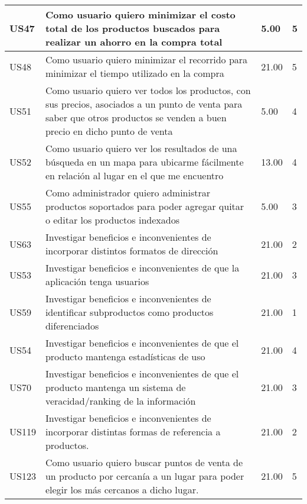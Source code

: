 \documentclass[a4paper,8pt]{article}
\begin{document}
\begin{tabular}{|p{1cm}|p{10cm}|p{1cm}|p{1cm}|}
\hline	
US47 &Como usuario quiero minimizar el costo total de los productos buscados para realizar un ahorro en la compra total &5.00&5\\ 
\hline	
US48 &Como usuario quiero minimizar el recorrido para minimizar el tiempo utilizado en la compra &21.00&5\\ 
\hline	
US51 &Como usuario quiero ver todos los productos, con sus precios, asociados a un punto de venta para saber que otros productos se venden a buen precio en dicho punto de venta &5.00&4\\ 
\hline	
US52 &Como usuario quiero ver los resultados de una búsqueda en un mapa para ubicarme fácilmente en relación al lugar en el que me encuentro& 13.00&4\\ 
\hline
US55 &Como administrador quiero administrar productos soportados para poder agregar quitar o editar los productos indexados &5.00&3\\ 
\hline
US63 &Investigar beneficios e inconvenientes de incorporar distintos formatos de dirección &21.00&2\\ 
\hline
US53 &Investigar beneficios e inconvenientes de que la aplicación tenga usuarios& 21.00&3\\ 
\hline	
US59 &Investigar beneficios e inconvenientes de identificar subproductos como productos diferenciados &21.00&1\\ 
\hline		
US54 &Investigar beneficios e inconvenientes de que el producto mantenga estadísticas de uso &21.00&4\\ 
\hline	
US70 &Investigar beneficios e inconvenientes de que el producto mantenga un sistema de veracidad/ranking de la información &21.00&3\\ 	
\hline	
US119 &Investigar beneficios e inconvenientes de incorporar distintas formas de referencia a productos. &21.00&2\\ 
\hline		
US123 &Como usuario quiero buscar puntos de venta de un producto por cercanía a un lugar para poder elegir los más cercanos a dicho lugar. &21.00&5\\ 
\hline
\hline
\end{tabular}
\newpage
{}
\end{document}
